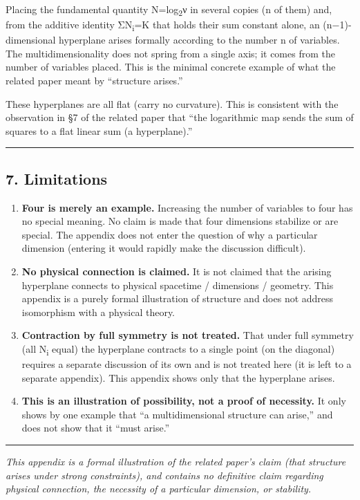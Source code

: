 \documentclass[11pt]{ltjsarticle}
\begin{document}
Placing the fundamental quantity N=log\textsubscript{2}ν in several copies (n of them)
and, from the additive identity ΣN\textsubscript{i}=K that holds their sum constant
alone, an (n−1)-dimensional hyperplane arises formally according to the
number n of variables. The multidimensionality does not spring from a
single axis; it comes from the number of variables placed. This is the
minimal concrete example of what the related paper meant by ``structure
arises.''

These hyperplanes are all flat (carry no curvature). This is consistent
with the observation in §7 of the related paper that ``the logarithmic
map sends the sum of squares to a flat linear sum (a hyperplane).''

\begin{center}\rule{0.5\linewidth}{0.5pt}\end{center}

\subsection{7. Limitations}\label{limitations}

\begin{enumerate}
\def\labelenumi{\arabic{enumi}.}
\item
  \textbf{Four is merely an example.} Increasing the number of variables
  to four has no special meaning. No claim is made that four dimensions
  stabilize or are special. The appendix does not enter the question of
  why a particular dimension (entering it would rapidly make the
  discussion difficult).
\item
  \textbf{No physical connection is claimed.} It is not claimed that the
  arising hyperplane connects to physical spacetime / dimensions /
  geometry. This appendix is a purely formal illustration of structure
  and does not address isomorphism with a physical theory.
\item
  \textbf{Contraction by full symmetry is not treated.} That under full
  symmetry (all N\textsubscript{i} equal) the hyperplane contracts to a single point (on
  the diagonal) requires a separate discussion of its own and is not
  treated here (it is left to a separate appendix). This appendix shows
  only that the hyperplane arises.
\item
  \textbf{This is an illustration of possibility, not a proof of
  necessity.} It only shows by one example that ``a multidimensional
  structure can arise,'' and does not show that it ``must arise.''
\end{enumerate}

\begin{center}\rule{0.5\linewidth}{0.5pt}\end{center}

\emph{This appendix is a formal illustration of the related paper's
claim (that structure arises under strong constraints), and contains no
definitive claim regarding physical connection, the necessity of a
particular dimension, or stability.}
\end{document}
